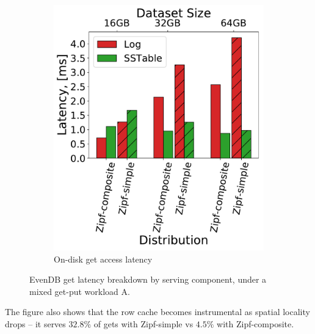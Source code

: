 \documentclass[sigplan,10pt]{acmart}
\newcommand{\sys}{EvenDB}
\providecommand{\DIFaddbeginFL}{} %
\providecommand{\DIFaddendFL}{} %
\providecommand{\DIFdelbeginFL}{} %
\providecommand{\DIFdelendFL}{} %
\begin{document}
\begin{figure}[htb]
\DIFdelendFL %
\DIFdelbeginFL %
\DIFdelendFL \DIFaddbeginFL \begin{subfigure}{0.49\linewidth}
\DIFaddendFL \includegraphics[width=\textwidth]{figs/Latency_A.pdf}
\caption{On-disk get access latency}
\label{fig:readstat:lat}
\end{subfigure}
\caption{{\sys\/ get latency breakdown by serving component, under a mixed get-put workload A.}}
\label{fig:readstat}
\end{figure}

The figure also shows that the row cache becomes instrumental as spatial locality drops -- it serves $32.8\%$ of gets with Zipf-simple 
vs $4.5\%$ with Zipf-composite. 
\end{document}
